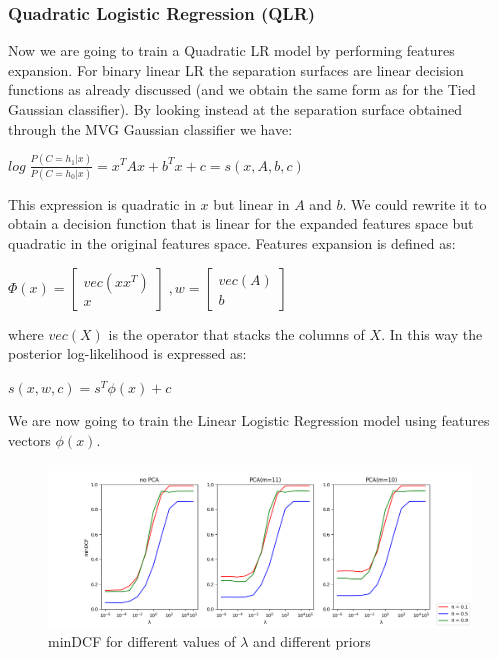 \documentclass[10pt, a4paper, twocolumn]{article} %
\begin{document}
\subsubsection{Quadratic Logistic Regression (QLR)}
Now we are going to train a Quadratic LR model by performing features expansion.
For binary linear LR the separation surfaces are linear decision functions as already discussed (and
we obtain the same form as for the Tied Gaussian classifier). By looking instead at the separation surface
obtained through the MVG Gaussian classifier we have:
\begin{center}
	\begin{math}
		log\;\frac{P(C=h_1|x)}{P(C=h_0|x)} = x^TAx + b^Tx + c = s(x, A, b, c)
	\end{math}
\end{center}
This expression is quadratic in $x$ but linear in $A$ and $b$. 
We could rewrite it to obtain a decision function that is linear for the expanded features space
but quadratic in the original features space. Features expansion is defined as:
\begin{center}
	\begin{math}
		\Phi(x) = \begin{bmatrix}
					vec(xx^T)\\
					x
				  \end{bmatrix} \;, 
		w= 		 \begin{bmatrix}
					vec(A)\\
					b
				  \end{bmatrix}
	\end{math}
\end{center}
where $vec(X)$ is the operator that stacks the columns of $X$. In this way the posterior log-likelihood is expressed as:
\begin{center}
	\begin{math}
		s(x, w, c) = s^T\phi(x)+c
	\end{math}
\end{center}
We are now going to train the Linear Logistic Regression model using features vectors $\phi(x)$.\\
\begin{figure}[ht!]
	\includegraphics[width=\linewidth]{./Pictures/FeaturesAnalysis/dcfplotQLR.png}
	\caption{minDCF for different values of $\lambda$ and different priors}
	\label{dcfQLR} 
\end{figure}
\end{document}
